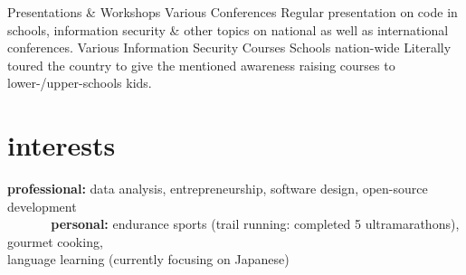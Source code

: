 \documentclass[]{friggeri-cv} %
\begin{document}
\begin{entrylist}
{Presentations \& Workshops}
{Various Conferences}
{Regular presentation on code in schools, information security \& other topics on national as well as international conferences.}
{Various Information Security Courses}
{Schools nation-wide}
{Literally toured the country to give the mentioned awareness raising courses to lower-/upper-schools kids.}
\end{entrylist}


\section{interests}
\textbf{professional:} data analysis, entrepreneurship, software design, open-source development \\
\textbf{\ \ \ \ \ \ personal:} endurance sports (trail running: completed 5 ultramarathons), gourmet cooking, \\
                               language learning (currently focusing on Japanese)
\end{document}
